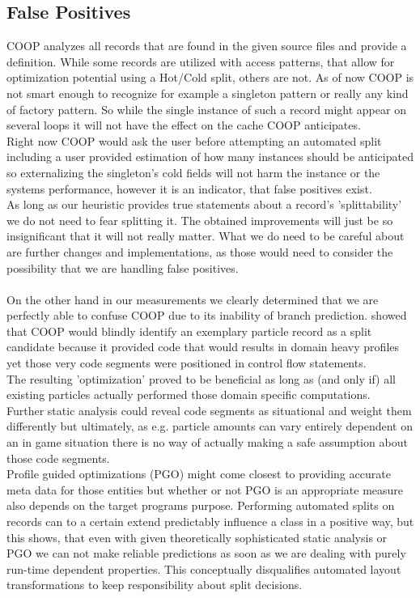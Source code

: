 \subsection{False Positives}\label{false_positives}
COOP analyzes all records that are found in the given source files and provide a definition. While some records are utilized with access patterns, that allow for optimization potential using a Hot/Cold split, others are not. As of now COOP is not smart enough to recognize for example a singleton pattern or really any kind of factory pattern. So while the single instance of such a record might appear on several loops it will not have the effect on the cache COOP anticipates.\\
Right now COOP would ask the user before attempting an automated split including a user provided estimation of how many instances should be anticipated so externalizing the singleton's cold fields will not harm the instance or the systems performance, however it is an indicator, that false positives exist.\\
As long as our heuristic provides true statements about a record's 'splittability' we do not need to fear splitting it. The obtained improvements will just be so insignificant that it will not really matter. What we do need to be careful about are further changes and implementations, as those would need to consider the possibility that we are handling false positives.\\\\
On the other hand in our measurements we clearly determined that we are perfectly able to confuse COOP due to its inability of branch prediction.  showed that COOP would blindly identify an exemplary particle record as a split candidate because it provided code that would results in domain heavy profiles yet those very code segments were positioned in control flow statements.\\
The resulting 'optimization' proved to be beneficial as long as (and only if) all existing particles actually performed those domain specific computations.\\
Further static analysis could reveal code segments as situational and weight them differently but ultimately, as e.g. particle amounts can vary entirely dependent on an in game situation there is no way of actually making a safe assumption about those code segments.\\
Profile guided optimizations (PGO) might come closest to providing accurate meta data for those entities but whether or not PGO is an appropriate measure also depends on the target programs purpose. Performing automated splits on records can to a certain extend predictably influence a class in a positive way, but this shows, that even with given theoretically sophisticated static analysis or PGO we can not make reliable predictions as soon as we are dealing with purely run-time dependent properties. This conceptually disqualifies automated layout transformations to keep responsibility about split decisions.\\\\
